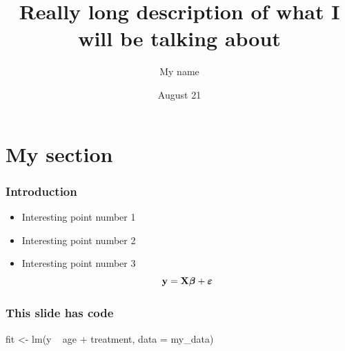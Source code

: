 \documentclass{beamer}
\author{My name}
\institute{University of Somewhere}
\title[Short title]{Really long description of what I will be talking about}
\date{August 21}
\begin{document}
\begin{frame}
  \titlepage
\end{frame}

\section{My section}

\begin{frame}
  \frametitle{Introduction}
  \begin{itemize}
  \item <1-> Interesting point number 1
  \item <2-> Interesting point number 2
  \item <3-> Interesting point number 3
    $$ \mathbf{y} = \mathbf{X} \bm{\beta} + \bm{\varepsilon} $$
  \end{itemize}
\end{frame}

\begin{frame}[fragile]
  \frametitle{This slide has code}
  \begin{code}
    fit <- lm(y ~ age + treatment, data = my_data)
  \end{code}
\end{frame}
\end{document}
